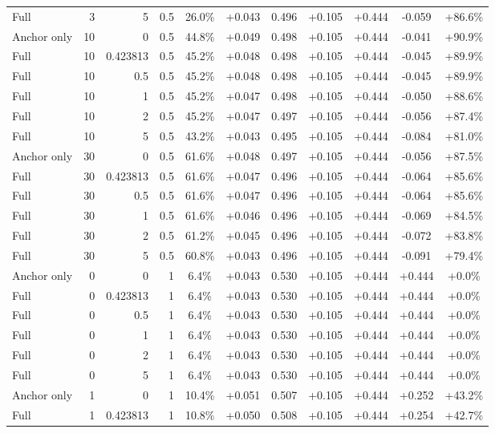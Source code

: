 \begin{table}[htbp]
\begin{tabular}{lrrrccccccc}
Full & 3 & 5 & 0.5 & 26.0\% & +0.043 & 0.496 & +0.105 & +0.444 & -0.059 & +86.6\% \\
Anchor only & 10 & 0 & 0.5 & 44.8\% & +0.049 & 0.498 & +0.105 & +0.444 & -0.041 & +90.9\% \\
Full & 10 & 0.423813 & 0.5 & 45.2\% & +0.048 & 0.498 & +0.105 & +0.444 & -0.045 & +89.9\% \\
Full & 10 & 0.5 & 0.5 & 45.2\% & +0.048 & 0.498 & +0.105 & +0.444 & -0.045 & +89.9\% \\
Full & 10 & 1 & 0.5 & 45.2\% & +0.047 & 0.498 & +0.105 & +0.444 & -0.050 & +88.6\% \\
Full & 10 & 2 & 0.5 & 45.2\% & +0.047 & 0.497 & +0.105 & +0.444 & -0.056 & +87.4\% \\
Full & 10 & 5 & 0.5 & 43.2\% & +0.043 & 0.495 & +0.105 & +0.444 & -0.084 & +81.0\% \\
Anchor only & 30 & 0 & 0.5 & 61.6\% & +0.048 & 0.497 & +0.105 & +0.444 & -0.056 & +87.5\% \\
Full & 30 & 0.423813 & 0.5 & 61.6\% & +0.047 & 0.496 & +0.105 & +0.444 & -0.064 & +85.6\% \\
Full & 30 & 0.5 & 0.5 & 61.6\% & +0.047 & 0.496 & +0.105 & +0.444 & -0.064 & +85.6\% \\
Full & 30 & 1 & 0.5 & 61.6\% & +0.046 & 0.496 & +0.105 & +0.444 & -0.069 & +84.5\% \\
Full & 30 & 2 & 0.5 & 61.2\% & +0.045 & 0.496 & +0.105 & +0.444 & -0.072 & +83.8\% \\
Full & 30 & 5 & 0.5 & 60.8\% & +0.043 & 0.496 & +0.105 & +0.444 & -0.091 & +79.4\% \\
Anchor only & 0 & 0 & 1 & 6.4\% & +0.043 & 0.530 & +0.105 & +0.444 & +0.444 & +0.0\% \\
Full & 0 & 0.423813 & 1 & 6.4\% & +0.043 & 0.530 & +0.105 & +0.444 & +0.444 & +0.0\% \\
Full & 0 & 0.5 & 1 & 6.4\% & +0.043 & 0.530 & +0.105 & +0.444 & +0.444 & +0.0\% \\
Full & 0 & 1 & 1 & 6.4\% & +0.043 & 0.530 & +0.105 & +0.444 & +0.444 & +0.0\% \\
Full & 0 & 2 & 1 & 6.4\% & +0.043 & 0.530 & +0.105 & +0.444 & +0.444 & +0.0\% \\
Full & 0 & 5 & 1 & 6.4\% & +0.043 & 0.530 & +0.105 & +0.444 & +0.444 & +0.0\% \\
Anchor only & 1 & 0 & 1 & 10.4\% & +0.051 & 0.507 & +0.105 & +0.444 & +0.252 & +43.2\% \\
Full & 1 & 0.423813 & 1 & 10.8\% & +0.050 & 0.508 & +0.105 & +0.444 & +0.254 & +42.7\% \\

\end{tabular}
\end{table}
